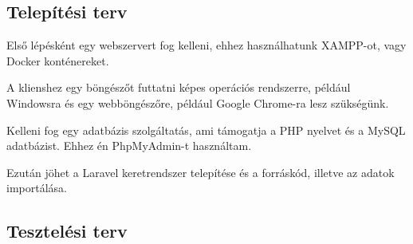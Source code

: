 \documentclass[
]{thesis-ekf}
\theoremstyle{definition}
\theoremstyle{remark}
\begin{document}
\subsection{Telepítési terv}

Első lépésként egy webszervert fog kelleni, ehhez használhatunk XAMPP-ot, vagy Docker konténereket.

A klienshez egy böngészőt futtatni képes operációs rendszerre, például Windowsra és egy webböngészőre, például Google Chrome-ra lesz szükségünk.

Kelleni fog egy adatbázis szolgáltatás, ami támogatja a PHP nyelvet és a MySQL adatbázist. Ehhez én PhpMyAdmin-t használtam.

Ezután jöhet a Laravel keretrendszer telepítése és a forráskód, illetve az adatok importálása.

\subsection{Tesztelési terv}
\end{document}
